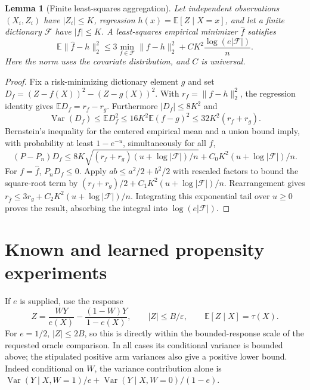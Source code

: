 \documentclass[11pt]{article}
\newtheorem{lemma}[theorem]{Lemma}
\theoremstyle{remark}
\newcommand{\E}{\mathbb E}
\newcommand{\Var}{\operatorname{Var}}
\begin{document}
\begin{lemma}[Finite least-squares aggregation]\label{erm}
Let independent observations $(X_i,Z_i)$ have $|Z_i|\leq K$, regression $h(x)=\E[Z\mid X=x]$, and let a finite dictionary $\mathcal F$ have $|f|\leq K$. A least-squares empirical minimizer $\widehat f$ satisfies
\[
 \E\|\widehat f-h\|_2^2
 \leq3\min_{f\in\mathcal F}\|f-h\|_2^2
          +C K^2\frac{\log(e|\mathcal F|)}n.
\]
Here the norm uses the covariate distribution, and $C$ is universal.
\end{lemma}
\begin{proof}
Fix a risk-minimizing dictionary element $g$ and set
$D_f=(Z-f(X))^2-(Z-g(X))^2$. With $r_f=\|f-h\|_2^2$, the regression identity gives $\E D_f=r_f-r_g$. Furthermore
$|D_f|\leq8K^2$ and
\[
 \Var(D_f)\leq\E D_f^2
 \leq16K^2\E(f-g)^2\leq32K^2(r_f+r_g).
\]
Bernstein's inequality for the centered empirical mean and a union bound imply, with probability at least $1-e^{-u}$, simultaneously for all $f$,
\[
 (P-P_n)D_f\leq
 8K\sqrt{(r_f+r_g)(u+\log|\mathcal F|)/n}
       +C_0K^2(u+\log|\mathcal F|)/n.
\]
For $f=\widehat f$, $P_nD_f\leq0$. Apply $ab\leq a^2/2+b^2/2$ with rescaled factors to bound the square-root term by $(r_f+r_g)/2+C_1K^2(u+\log|\mathcal F|)/n$. Rearrangement gives
$r_{\widehat f}\leq3r_g+C_2K^2(u+\log|\mathcal F|)/n$. Integrating this exponential tail over $u\geq0$ proves the result, absorbing the integral into $\log(e|\mathcal F|)$.
\end{proof}

\section{Known and learned propensity experiments}
If $e$ is supplied, use the response
\[
 Z=\frac{WY}{e(X)}-\frac{(1-W)Y}{1-e(X)},
 \qquad |Z|\leq B/\varepsilon,
 \qquad \E[Z\mid X]=\tau(X).
\]
For $e=1/2$, $|Z|\leq2B$, so this is directly within the bounded-response scale of the requested oracle comparison. In all cases its conditional variance is bounded above; the stipulated positive arm variances also give a positive lower bound. Indeed conditional on $W$, the variance contribution alone is
$\Var(Y\mid X,W=1)/e+\Var(Y\mid X,W=0)/(1-e)$.
\end{document}
